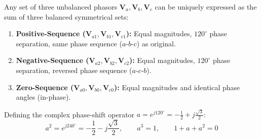 \documentclass[12pt,a4paper]{article}
\begin{document}
\begin{tcolorbox}[defbox, title={\textbf{Fortescue's Theorem and the Complex Operator $a$}}]
Any set of three unbalanced phasors $\mathbf{V}_a, \mathbf{V}_b, \mathbf{V}_c$ can be uniquely expressed as the sum of three balanced symmetrical sets:
\begin{enumerate}[leftmargin=*, itemsep=2pt, topsep=1pt]
  \item \textbf{Positive-Sequence ($\mathbf{V}_{a1}, \mathbf{V}_{b1}, \mathbf{V}_{c1}$):} Equal magnitudes, $120^\circ$ phase separation, same phase sequence ($a$-$b$-$c$) as original.
  \item \textbf{Negative-Sequence ($\mathbf{V}_{a2}, \mathbf{V}_{b2}, \mathbf{V}_{c2}$):} Equal magnitudes, $120^\circ$ phase separation, reversed phase sequence ($a$-$c$-$b$).
  \item \textbf{Zero-Sequence ($\mathbf{V}_{a0}, \mathbf{V}_{b0}, \mathbf{V}_{c0}$):} Equal magnitudes and identical phase angles (in-phase).
\end{enumerate}
Defining the complex phase-shift operator $a = e^{j 120^\circ} = -\frac{1}{2} + j\frac{\sqrt{3}}{2}$:
\begin{equation}
  a^2 = e^{j 240^\circ} = -\frac{1}{2} - j\frac{\sqrt{3}}{2}, \qquad a^3 = 1, \qquad 1 + a + a^2 = 0
\end{equation}
\end{tcolorbox}
\end{document}
